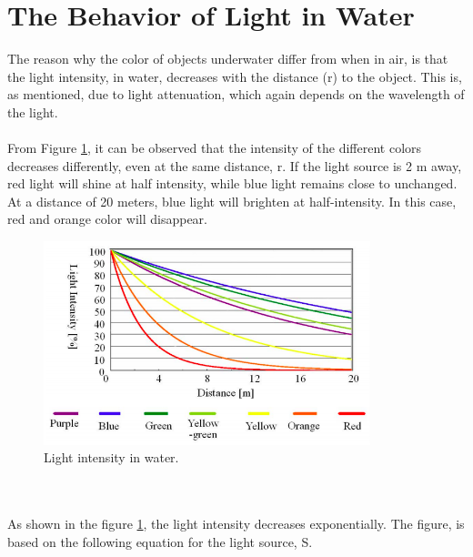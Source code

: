 \section{The Behavior of Light in Water}\label{lightinwater}
The reason why the color of objects underwater differ from when in air, is that the light intensity, in water, decreases with the distance (r) to the object. This is, as mentioned, due to light attenuation, which again depends on the wavelength of the light. %
\\\\
From Figure \ref{fig:lightinwater}, it can be observed that the intensity of the different colors decreases differently, even at the same distance, r. If the light source is 2 m away, red light will shine at half intensity, while blue light remains close to unchanged. At a distance of 20 meters, blue light will brighten at half-intensity. In this case, red and orange color will disappear.
\begin{figure}[H]
\centering
  \includegraphics[width=9.5cm]{Images/theory/intensity.png}
  \caption{Light intensity in water.}
  \label{fig:lightinwater}
\end{figure}
\\\\
\noindent
As shown in the figure \ref{fig:lightinwater}, the light intensity decreases exponentially. The figure, is based on the following equation for the light source, S. 

